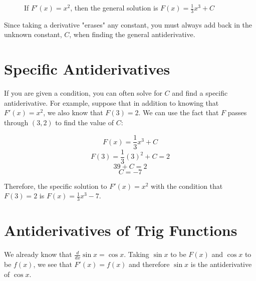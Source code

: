 \begin{figure}[htbp]
	\centering
	\caption{If $F'(x) = x^2$, then the general solution is $F(x) = \frac{1}{3}x^3+C$}
	\label{fig:antideriv}
\end{figure} 

Since taking a derivative "erases" any constant, you must always add 
back in the unknown constant, $C$, when finding the general 
antiderivative. 

\section{Specific Antiderivatives}
If you are given a condition, you can often solve for $C$ and find a 
specific antiderivative. For example, suppose that in addition to 
knowing that $F'(x) = x^2$, we also know that $F(3) = 2$. We can use 
the fact that $F$ passes through $(3, 2)$ to find the value of $C$:

$$F(x) = \frac{1}{3} x^3 + C$$
$$F(3) = \frac{1}{3} (3)^2 + C = 2$$
$$39 + C = 2$$
$$C = -7$$

Therefore, the specific solution to $F'(x) = x^2$ with the condition 
that $F(3) =2$ is $F(x) = \frac{1}{3} x^3 - 7$. 

\section{Antiderivatives of Trig Functions}
We already know that $\frac{d}{dx} \sin{x} = \cos{x}$. Taking $\sin{x}$ 
to be $F(x)$ and $\cos{x}$ to be $f(x)$, we see that $F'(x) = f(x)$ 
and therefore $\sin{x}$ is the antiderivative of $\cos{x}$. 

